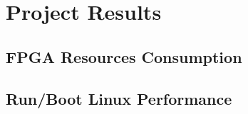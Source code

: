 \chapter{Project Results}

\section{FPGA Resources Consumption}

\section{Run/Boot Linux Performance}